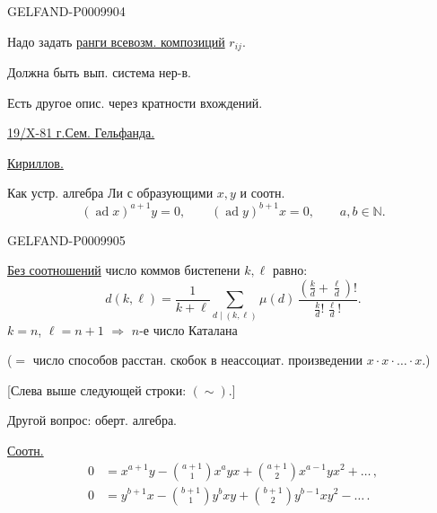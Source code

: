 \begin{GelfandAdjacentEvidence}{GELFAND-P000990}{4}


Надо задать \underline{ранги всевозм. композиций} $r_{ij}$.

Должна быть вып. система нер-в.

Есть другое опис. через кратности вхождений.

\underline{\underline{19/X-81 г.}}\qquad\underline{Сем. Гельфанда.}

\underline{Кириллов.}

Как устр. алгебра Ли с образующими $x,y$ и соотн.
\[
(\operatorname{ad}x)^{a+1}y=0,\qquad
(\operatorname{ad}y)^{b+1}x=0,\qquad a,b\in\mathbb{N}.
\]
\end{GelfandAdjacentEvidence}
\begin{GelfandAdjacentEvidence}{GELFAND-P000990}{5}


\underline{Без соотношений} число коммов бистепени $k,\ell$ равно:
\[
d(k,\ell)=\frac{1}{k+\ell}\sum_{d\mid(k,\ell)}
\mu(d)\,\frac{\left(\frac{k}{d}+\frac{\ell}{d}\right)!}
{\frac{k}{d}!\,\frac{\ell}{d}!}.
\]
$k=n$, $\ell=n+1$ $\Rightarrow$ $n$-е число Каталана

($=$ число способов расстан. скобок в неассоциат. произведении $x\cdot x\cdot\ldots\cdot x$.)

[Слева выше следующей строки: $(\sim)$.]

Другой вопрос: оберт. алгебра.

\underline{Соотн.}
\begin{align*}
0&=x^{a+1}y-\binom{a+1}{1}x^ayx+\binom{a+1}{2}x^{a-1}yx^2+\ldots\,,\\
0&=y^{b+1}x-\binom{b+1}{1}y^bxy+\binom{b+1}{2}y^{b-1}xy^2-\ldots\,.
\end{align*}
\end{GelfandAdjacentEvidence}
